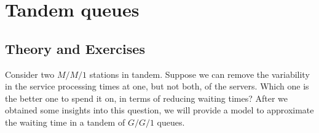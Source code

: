
\section{Tandem queues}
\label{sec:tandem-queues}


\subsection*{Theory and Exercises}



Consider two $M/M/1$ stations in tandem. Suppose we can remove the variability in the service processing times at one, but not both, of the servers. Which one is the better one to spend it on, in terms of reducing waiting times? After we obtained some insights into this question, we will provide a model to approximate the waiting time in a tandem of $G/G/1$ queues.

